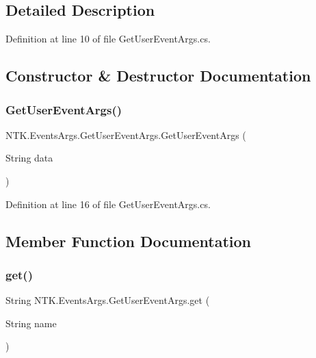 \subsection{Detailed Description}


Definition at line 10 of file Get\+User\+Event\+Args.\+cs.



\subsection{Constructor \& Destructor Documentation}
\mbox{\label{class_n_t_k_1_1_events_args_1_1_get_user_event_args_adbfb4712272c7eb674afee8be6b58607}} 
\subsubsection{\texorpdfstring{GetUserEventArgs()}{GetUserEventArgs()}}
{\footnotesize\ttfamily N\+T\+K.\+Events\+Args.\+Get\+User\+Event\+Args.\+Get\+User\+Event\+Args (\begin{DoxyParamCaption}\item[{String}]{data }\end{DoxyParamCaption})}



Definition at line 16 of file Get\+User\+Event\+Args.\+cs.



\subsection{Member Function Documentation}
\mbox{\label{class_n_t_k_1_1_events_args_1_1_get_user_event_args_a25b949fa5067e13604f676e3d440715c}} 
\subsubsection{\texorpdfstring{get()}{get()}}
{\footnotesize\ttfamily String N\+T\+K.\+Events\+Args.\+Get\+User\+Event\+Args.\+get (\begin{DoxyParamCaption}\item[{String}]{name }\end{DoxyParamCaption})}



